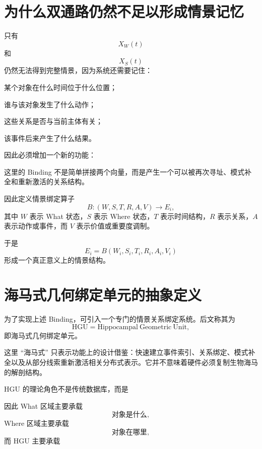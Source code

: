 \section{为什么双通路仍然不足以形成情景记忆}

只有
\[
X_W(t)
\]
和
\[
X_S(t)
\]
仍然无法得到完整情景，因为系统还需要记住：

某个对象在什么时间位于什么位置；

谁与该对象发生了什么动作；

这些关系是否与当前主体有关；

该事件后来产生了什么结果。

因此必须增加一个新的功能：
\begin{statementbox}
\centering
{}
\end{statementbox}

这里的 Binding 不是简单拼接两个向量，而是产生一个可以被再次寻址、模式补全和重新激活的关系结构。

因此定义情景绑定算子
\[
B:
(
W,S,T,R,A,V
)
\rightarrow
E_i,
\]
其中 $W$ 表示 What 状态，$S$ 表示 Where 状态，$T$ 表示时间结构，$R$ 表示关系，$A$ 表示动作或事件，而 $V$ 表示价值或重要度调制。

于是
\[
\boxed{
E_i
=
B(W_i,S_i,T_i,R_i,A_i,V_i)
}
\]
形成一个真正意义上的情景结构。

\section{海马式几何绑定单元的抽象定义}

为了实现上述 Binding，可引入一个专门的情景关系绑定系统。后文称其为
\[
\mathrm{HGU}
=
\mathrm{Hippocampal\ Geometric\ Unit},
\]
即海马式几何绑定单元。

这里 ``海马式'' 只表示功能上的设计借鉴：快速建立事件索引、关系绑定、模式补全以及从部分线索重新激活相关分布式表示。它并不意味着硬件必须复制生物海马的解剖结构。

HGU 的理论角色不是传统数据库，而是
\begin{statementbox}
\centering
{}
\end{statementbox}

因此 What 区域主要承载
\[
\text{对象是什么},
\]
Where 区域主要承载
\[
\text{对象在哪里},
\]
而 HGU 主要承载
\begin{statementbox}
\centering
{}
\end{statementbox}


